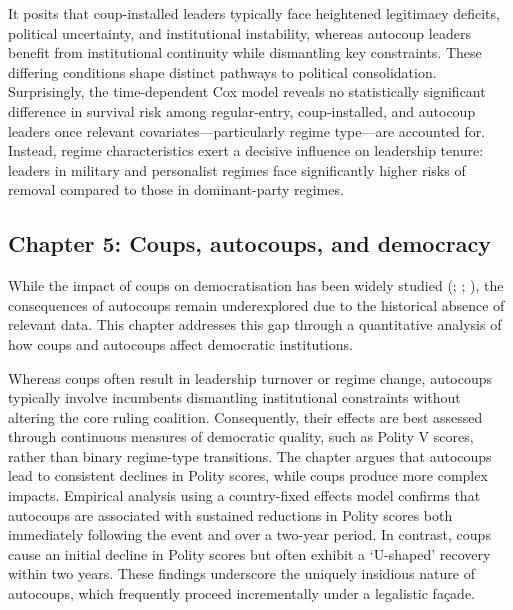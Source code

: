 \documentclass[
  12pt,
]{report}
\begin{document}
It posits that coup-installed leaders typically face heightened
legitimacy deficits, political uncertainty, and institutional
instability, whereas autocoup leaders benefit from institutional
continuity while dismantling key constraints. These differing conditions
shape distinct pathways to political consolidation. Surprisingly, the
time-dependent Cox model reveals no statistically significant difference
in survival risk among regular-entry, coup-installed, and autocoup
leaders once relevant covariates---particularly regime type---are
accounted for. Instead, regime characteristics exert a decisive
influence on leadership tenure: leaders in military and personalist
regimes face significantly higher risks of removal compared to those in
dominant-party regimes.

\subsection*{Chapter 5: Coups, autocoups, and
democracy}\label{chapter-5-coups-autocoups-and-democracy}

While the impact of coups on democratisation has been widely studied
(;
;
), the consequences of
autocoups remain underexplored due to the historical absence of relevant
data. This chapter addresses this gap through a quantitative analysis of
how coups and autocoups affect democratic institutions.

Whereas coups often result in leadership turnover or regime change,
autocoups typically involve incumbents dismantling institutional
constraints without altering the core ruling coalition. Consequently,
their effects are best assessed through continuous measures of
democratic quality, such as Polity V scores, rather than binary
regime-type transitions. The chapter argues that autocoups lead to
consistent declines in Polity scores, while coups produce more complex
impacts. Empirical analysis using a country-fixed effects model confirms
that autocoups are associated with sustained reductions in Polity scores
both immediately following the event and over a two-year period. In
contrast, coups cause an initial decline in Polity scores but often
exhibit a `U-shaped' recovery within two years. These findings
underscore the uniquely insidious nature of autocoups, which frequently
proceed incrementally under a legalistic façade.
\end{document}
